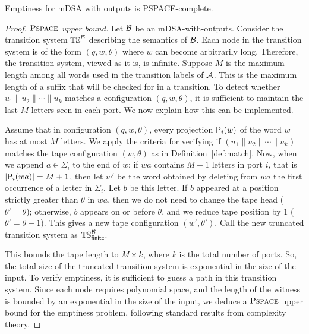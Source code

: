 
\begin{theorem}
Emptiness for mDSA with outputs is PSPACE-complete.
\end{theorem}
\begin{proof}
    \emph{$\operatorname{\textsc{Pspace}}$ upper bound.} Let $\mathcal{B}$ be an mDSA-with-outputs. Consider the transition system $\mathbb{TS}^{\mathcal{B}}$ describing the semantics of $\mathcal{B}$. Each node in the transition system is of the form $(q, w, \theta)$ where $w$ can become arbitrarily long. Therefore, the transition system, viewed as it is, is infinite. Suppose $M$ is the maximum length among all words used in the transition labels of $\mathcal{A}$. This is the maximum length of a suffix that will be checked for in a transition. To detect whether $u_1 \parallel u_2 \parallel \cdots \parallel u_k$ matches a configuration $(q, w, \theta)$, it is sufficient to maintain the last $M$ letters seen in each port. We now explain how this can be implemented.
    
    Assume that in configuration $(q, w, \theta)$, every projection $\mathsf{P}_{i}(w)$ of the word $w$ has at most $M$ letters. We apply the criteria for verifying if $(u_1 \parallel u_2 \parallel \cdots \parallel u_k)$ matches the tape configuration $(w, \theta)$ as in Definition~\ref{def:match}. Now, when we append $a \in \Sigma_i$ to the end of $w$: if $wa$ contains $M+1$ letters in port $i$, that is $|\mathsf{P}_{i}(wa)| = M+1$, then let $w'$ be the word obtained by deleting from $wa$ the first occurrence of a letter in $\Sigma_i$. Let $b$ be this letter. If $b$ appeared at a position strictly greater than $\theta$ in $wa$, then we do not need to change the tape head ($\theta' = \theta$); otherwise, $b$ appears on or before $\theta$, and we reduce tape position by $1$ ($\theta' = \theta - 1$). This gives a new tape configuration $(w', \theta')$. Call the new truncated transition system as $\mathbb{TS}_{\mathsf{finite}}^{\mathcal{B}}$.
    
    
    This bounds the tape length to $M \times k$, where $k$ is the total number of ports. So, the total size of the truncated transition system is exponential in the size of the input. To verify emptiness, it is sufficient to guess a path in this transition system. Since each node requires polynomial space, and the length of the witness is bounded by an exponential in the size of the input, we deduce a $\operatorname{\textsc{Pspace}}$ upper bound for the emptiness problem, following standard results from complexity theory.


\end{proof}
